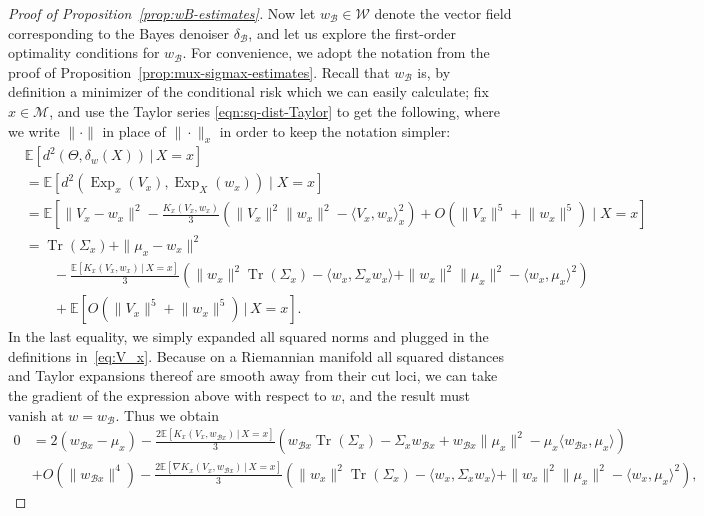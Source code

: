 \documentclass[preprint]{imsart}
\theoremstyle{plain}
\theoremstyle{definition}
\newcommand{\Ebb}{\mathbb{E}}
\newcommand{\Mcal}{\mathcal{M}}
\newcommand{\trace}{\operatorname{Tr}}
\newcommand{\B}{\mathcal{B}}
\DeclareMathOperator{\Exp}{Exp}
\begin{document}
\begin{appendix}
\begin{proof}[Proof of Proposition~\ref{prop:wB-estimates}]
    Now let $w_{\B}\in\mathcal{W}$ denote the vector field corresponding to the Bayes denoiser $\delta_{\B}$, and let us explore the first-order optimality conditions for $w_{\B}$.
    For convenience, we adopt the notation from the proof of Proposition~\ref{prop:mux-sigmax-estimates}.
    Recall that $w_{\B}$ is, by definition a minimizer of the conditional risk which we can easily calculate; fix $x\in\Mcal$, and use the Taylor series \eqref{eqn:sq-dist-Taylor} to get the following, where we write $\|\cdot\|$ in place of $\|\cdot\|_x$ in order to keep the notation simpler:
    \begin{equation}\label{eqn:conditional-risk}
    \begin{split}
        &\Ebb[d^2(\Theta,\delta_w(X))\,|\,X=x] \\
        &= \Ebb\left[ { d^2(\Exp_x (V_x),\Exp_X(w_x))} \mid X=x\right]\\
        & = \Ebb\left[\lVert V_x-w_x\rVert^2 - \frac{K_x(V_x,w_x)}{3}\left(\lVert V_x\rVert^2 \lVert w_x\rVert^2 - \langle V_x, w_x\rangle_{x}^2\right)  + O\!\left(\lVert V_x\rVert^5+\lVert  w_x\rVert^5\right)\mid X=x\right] \\
        &= \trace(\Sigma_x) + \|\mu_x- w_x\|^2 \\
        &\qquad- \frac{\Ebb[K_x(V_x,w_x)\,|\,X=x]}{3}\left(\| w_x\|^2\trace(\Sigma_x)  - \langle w_x,\Sigma_x w_x\rangle + \|w_x\|^2\|\mu_x\|^2 - \langle w_x,\mu_x\rangle^2\right) \\
        &\qquad+ \Ebb[O\!\left(\lVert V_x\rVert^5+\lVert  w_x\rVert^5\right)\,|\,X=x].
    \end{split}
\end{equation}
    In the last equality, we simply expanded all squared norms and plugged in the definitions in~\eqref{eq:V_x}.
    Because on a Riemannian manifold all squared distances and Taylor expansions thereof are smooth away from their cut loci, we can take the gradient of the expression above with respect to $w$, and the result must vanish at $w=w_{\B}$.
    Thus we obtain
    \begin{align*}
        0 &= 2(w_{\B x}-\mu_x) - \frac{2\Ebb[K_x(V_x,w_{\B x})\,|\,X=x]}{3}\left( w_{\B x}\trace(\Sigma_x)  - \Sigma_x w_{\B x} + w_{\B x}\|\mu_x\|^2 - \mu_x\langle w_{\B x},\mu_x\rangle\right) \\
        &+O\!\left(\lVert  w_{\B x}\rVert^4\right)-\frac{2\Ebb[\nabla K_x(V_x,w_{\B x})\,|\,X=x]}{3}\left(\| w_x\|^2\trace(\Sigma_x)  - \langle w_x,\Sigma_x w_x\rangle + \|w_x\|^2\|\mu_x\|^2 - \langle w_x,\mu_x\rangle^2\right),

\end{align*}
\end{proof}
\end{appendix}
\end{document}
